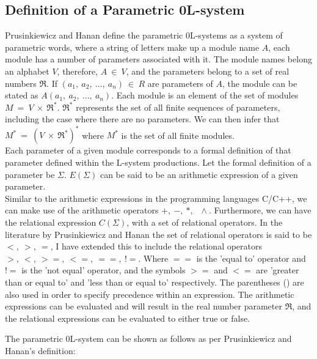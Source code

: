 \subsection{Definition of a Parametric 0L-system}

\begin{flushleft}

Prusinkiewicz and Hanan define the parametric 0L-systems as a system of parametric words, where a string of letters make up a module name $A$, each module has a number of parameters associated with it. The module names belong an alphabet $V$, therefore, $A~ \in~ V$, and the parameters belong to a set of real numbers $\Re$. If $(a_1,~ a_2,~ ...,~ a_n)~ \in~ R$ are parameters of $A$, the module can be stated as $A(a_1,~ a_2,~ ...,~ a_n)$. Each module is an element of the set of modules $M~ =~ V~ \times~ \Re^*$. $\Re^*$ represents the set of all finite sequences of parameters, including the case where there are no parameters. We can then infer that $M^*~ =~ (V~ \times~ \Re^*)^*$ where $M^*$ is the set of all finite modules. \\
Each parameter of a given module corresponds to a formal definition of that parameter defined within the L-system productions. Let the formal definition of a parameter be $\Sigma$. $ E(\Sigma) $ can be said to be an arithmetic expression of a given parameter.\\ Similar to the arithmetic expressions in the programming languages C/C++, we can make use of the arithmetic operators $ +,~ -,~ *,~ \,~ \wedge{}$. Furthermore, we can have the relational expression $C(\Sigma)$, with a set of relational operators. In the literature by Prusinkiewicz and Hanan the set of relational operators is said to be $<,~ >,~ =$, I have extended this to include the relational operators $>,~ <,~ >=,~ <=,~ ==,~ !=$. Where $==$ is the 'equal to' operator and $!=$ is the 'not equal' operator, and the symbols $>=$ and $<=$ are 'greater than or equal to' and 'less than or equal to' respectively. The parentheses () are also used in order to specify precedence within an expression. The arithmetic expressions can be evaluated and will result in the real number parameter $\Re $, and the relational expressions can be evaluated to either true or false. \\

\vspace{5mm}

The parametric 0L-system can be shown as follows as per Prusinkiewicz and Hanan's definition:\\


\end{flushleft}
